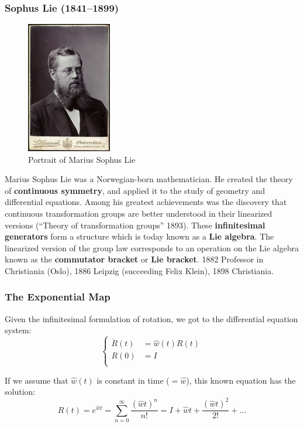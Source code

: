 \subsubsection{Sophus Lie (1841--1899)}%
\label{ssub:sophus_lie_1841_1899_}

\begin{figure}[ht]
\centering
\includegraphics[width=10em]{assets/img/sophus_lie.jpg}
\caption*{Portrait of Marius Sophus Lie}
\end{figure}

Marius Sophus Lie was a Norwegian-born mathematician.
He created the theory of \textbf{continuous symmetry}, and applied it to
the study of geometry and differential equations. Among his greatest
achievements was the discovery that continuous transformation
groups are better understood in their linearized versions
(``Theory of transformation groups'' 1893).
These \textbf{infinitesimal generators} form a structure which is today
known as a \textbf{Lie algebra}. The linearized version of the group law
corresponds to an operation on the Lie algebra known as
the \textbf{commutator bracket} or \textbf{Lie bracket}.
1882 Professor in Christiania (Oslo),
1886 Leipzig (succeeding Felix Klein),
1898 Christiania.


\subsubsection{The Exponential Map}%
\label{ssub:the_exponential_map}

Given the infinitesimal formulation of rotation,
we got to the differential equation system:
	\[\left\{ \begin{aligned}
		\dot{R}(t) &= \widehat{w}(t)R(t) \\
		R(0) &= I \\
	\end{aligned}\right.\]

If we assume that $\widehat{w}(t)$ is constant in time ($=\widehat{w}$),
this known equation has the solution:
	\[R(t) = e^{\widehat{w}t}
		= \sum_{n=0}^{\infty} \frac{{(\widehat{w}t)}^n }{n!}
		= I + \widehat{w}t + \frac{{(\widehat{w}t)}^2 }{2!} + \ldots \]

